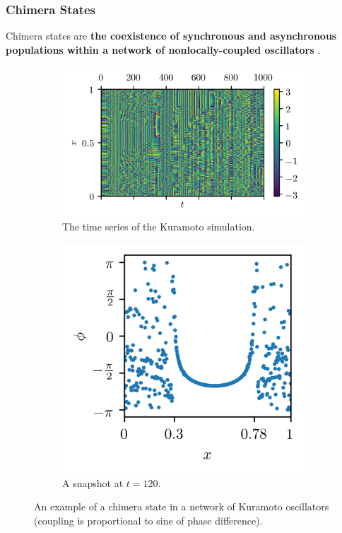 \documentclass[hyperref={hidelinks}]{beamer}
\begin{document}
\begin{frame}
  \frametitle{Chimera States}
  Chimera states are \textbf{the coexistence of synchronous and asynchronous populations within a network of nonlocally-coupled oscillators} \cite{Abrams2004,Kuramoto2002}.

  \begin{figure}[ht]
    \centering
    \begin{subfigure}{0.6\textwidth}
      \centering
      \includegraphics[width=\textwidth]{figure/kuramoto_overhead}
      \caption{The time series of the Kuramoto simulation.}
      \label{fig:kuramoto_overhead}
    \end{subfigure} %
    \begin{subfigure}{0.35\textwidth}
      \centering
      \includegraphics[width=\textwidth]{figure/kuramoto_snapshot}
      \caption{A snapshot at $t = 120$.}
      \label{fig:kuramoto_snapshot}
    \end{subfigure}
    \caption[Kuramoto simulation]{An example of a chimera state in a network of Kuramoto oscillators (coupling is proportional to sine of phase difference).
    }
    \label{fig:kuramoto_chimera}
  \end{figure}

\end{frame}
\end{document}
